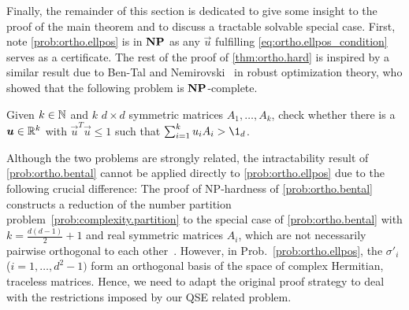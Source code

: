 Finally, the remainder of this section is dedicated to give some insight to the proof of the main theorem and to discuss a tractable solvable special case.
First, note \cref{prob:ortho.ellpos} is in $\mathbf{NP}$ as any $\vec u$ fulfilling \cref{eq:ortho.ellpos_condition} serves as a certificate.
The rest of the proof of \cref{thm:ortho.hard} is inspired by a similar result due to Ben-Tal and Nemirovski~\cite{Tal_1998_Robust} in robust optimization theory, who showed that the following problem is $\mathbf{NP}$-complete.
\begin{problem}
  \label{prob:ortho.bental}
  Given $k \in \mathbb{N}$ and $k$ $d\times d$ symmetric matrices $A_{1},\ldots,A_{k}$, check whether there is a ${\boldsymbol{u}} \in \mathbb{R}^k$ with $\vec{u}^{T}\vec{u} \leq 1$ such that $\sum_{i=1}^{k}u_{i}A_{i} > \1_{d}$.
\end{problem}
Although the two problems are strongly related, the intractability result of \cref{prob:ortho.bental} cannot be applied directly to \cref{prob:ortho.ellpos} due to the following crucial difference:
The proof of NP-hardness of \cref{prob:ortho.bental} constructs a reduction of the number partition problem~\ref{prob:complexity.partition} to the special case of \cref{prob:ortho.bental} with $k=\frac{d(d-1)}{2} + 1$ and real symmetric matrices $A_i$, which are not necessarily pairwise orthogonal to each other~\cite[Sec.~3.4.1]{Tal_1998_Robust}.
However, in Prob.~\ref{prob:ortho.ellpos}, the $\sigma'_i$ ($i=1,\ldots,d^2 - 1)$ form an orthogonal basis of the space of complex Hermitian, traceless matrices.
Hence, we need to adapt the original proof strategy to deal with the restrictions imposed by our QSE related problem.

